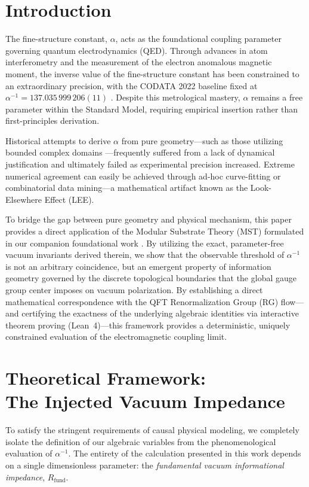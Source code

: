 \documentclass[12pt,a4paper]{article}
\begin{document}
\section{Introduction}

The fine-structure constant, $\alpha$, acts as the foundational coupling parameter governing quantum electrodynamics (QED). Through advances in atom interferometry and the measurement of the electron anomalous magnetic moment, the inverse value of the fine-structure constant has been constrained to an extraordinary precision, with the CODATA 2022 baseline fixed at $\alpha^{-1} = 137.035\,999\,206(11)$ \cite{codata2022}. Despite this metrological mastery, $\alpha$ remains a free parameter within the Standard Model, requiring empirical insertion rather than first-principles derivation.

Historical attempts to derive $\alpha$ from pure geometry—such as those utilizing bounded complex domains \cite{wyler1971}—frequently suffered from a lack of dynamical justification and ultimately failed as experimental precision increased. Extreme numerical agreement can easily be achieved through ad-hoc curve-fitting or combinatorial data mining—a mathematical artifact known as the Look-Elsewhere Effect (LEE).

To bridge the gap between pure geometry and physical mechanism, this paper provides a direct application of the Modular Substrate Theory (MST) formulated in our companion foundational work \cite{peinador2026_foundational}. By utilizing the exact, parameter-free vacuum invariants derived therein, we show that the observable threshold of $\alpha^{-1}$ is not an arbitrary coincidence, but an emergent property of information geometry governed by the discrete topological boundaries that the global gauge group center imposes on vacuum polarization. By establishing a direct mathematical correspondence with the QFT Renormalization Group (RG) flow—and certifying the exactness of the underlying algebraic identities via interactive theorem proving (Lean~4)—this framework provides a deterministic, uniquely constrained evaluation of the electromagnetic coupling limit.

\section{\texorpdfstring{Theoretical Framework:\\ The Injected Vacuum Impedance}{Theoretical Framework: The Injected Vacuum Impedance}}

To satisfy the stringent requirements of causal physical modeling, we completely isolate the definition of our algebraic variables from the phenomenological evaluation of $\alpha^{-1}$. The entirety of the calculation presented in this work depends on a single dimensionless parameter: the \textit{fundamental vacuum informational impedance}, $R_{\text{fund}}$.
\end{document}
